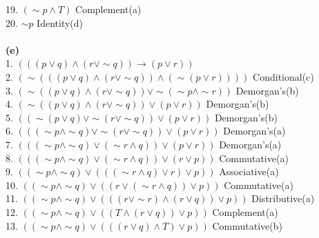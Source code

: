 \documentclass{article}
\begin{document}
19. $( \sim p \wedge T)$ \hspace*{\fill} Complement(a) \\
20. $\sim p$ \hspace*{\fill} Identity(d) \\ \\
\textbf{(e)} \\
1. $(((p\vee q) \wedge (r \vee \sim q)) \rightarrow (p \vee r))$ \\
2. $( \sim (((p \vee q) \wedge (r \vee \sim q)) \wedge ( \sim (p \vee r))))$ \hspace*{\fill} Conditional(c) \\ 
3. $ (\sim ((p \vee q) \wedge (r \vee \sim q)) \vee \sim (\sim p \wedge \sim r)) $\hspace*{\fill} Demorgan's(b) \\ 
4. $(\sim ((p \vee q) \wedge (r \vee \sim q)) \vee (p \vee r))$\hspace*{\fill} Demorgan's(b) \\ 
5. $(( \sim (p \vee q) \vee \sim (r \vee \sim q)) \vee (p \vee r))$\hspace*{\fill} Demorgan's(b) \\
6. $(((\sim p \wedge \sim q) \vee \sim (r \vee \sim q)) \vee (p \vee r))$\hspace*{\fill} Demorgan's(a) \\
7. $(((\sim p \wedge \sim q) \vee ( \sim r \wedge q)) \vee (p \vee r))$ \hspace*{\fill} Demorgan's(a) \\
8. $(((\sim p \wedge \sim q) \vee ( \sim r \wedge q)) \vee (r \vee p))$ \hspace*{\fill} Commutative(a) \\
9. $((\sim p \wedge \sim q) \vee ((( \sim r \wedge q) \vee r) \vee p))$ \hspace*{\fill} Associative(a) \\
10. $((\sim p \wedge \sim q) \vee ((r \vee (\sim r \wedge q)) \vee p))$ \hspace*{\fill} Commutative(a) \\
11. $((\sim p \wedge \sim q) \vee (((r \vee \sim r) \wedge (r \vee q)) \vee p))$ \hspace*{\fill} Distributive(a) \\
12. $((\sim p \wedge \sim q) \vee ((T \wedge (r \vee q)) \vee p))$ \hspace*{\fill} Complement(a) \\
13. $((\sim p \wedge \sim q) \vee (((r \vee q) \wedge T) \vee p))$ \hspace*{\fill} Commutative(b) \\
\end{document}
